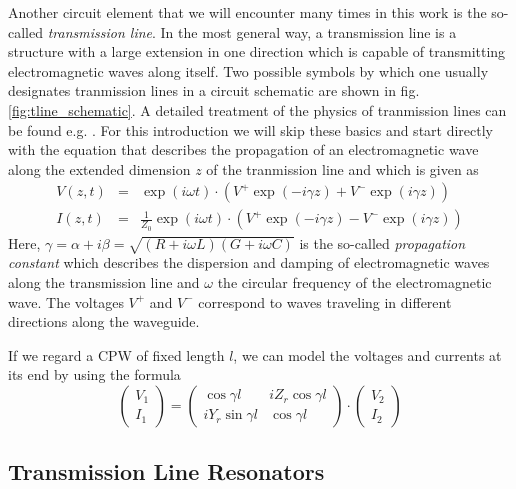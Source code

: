 Another circuit element that we will encounter many times in this work is the so-called {\it transmission line}. In the most general way, a transmission line is a structure with a large extension in one direction which is capable of transmitting electromagnetic waves along itself. Two possible symbols by which one usually designates tranmission lines in a circuit schematic are shown in fig. \ref{fig:tline_schematic}. A detailed treatment of the physics of tranmission lines can be found e.g. \cite{pozar_microwave_2011}. For this introduction we will skip these basics and start directly with the equation that describes the propagation of an electromagnetic wave along the extended dimension $z$ of the tranmission line and which is given as
%
\begin{eqnarray}
V(z,t) & = & \exp{\left(i\omega t\right)}\cdot\left(V^+ \exp{\left(-i\gamma z\right)}+V^-\exp{\left(i\gamma z\right)}\right) \\
I(z,t) & = & \frac{1}{Z_0}\exp{\left(i\omega t\right)}\cdot\left(V^+ \exp{\left(-i\gamma z\right)}-V^-\exp{\left(i\gamma z\right)}\right)
\end{eqnarray}
%
Here, $\gamma = \alpha+i\beta = \sqrt{(R+i\omega L)(G+i\omega C)}$ is the so-called {\it propagation constant} which describes the dispersion and damping of electromagnetic waves along the transmission line and $\omega$ the circular frequency of the electromagnetic wave. The voltages $V^+$ and $V^-$ correspond to waves traveling in different directions along the waveguide.

\smallskip

If we regard a CPW of fixed length $l$, we can model the voltages and currents at its end by using the formula\citep{pozar_microwave_2011}
%
\begin{equation}
\left( \begin{array}{c} V_1 \\ I_1 \end{array}\right) = \left( 
		\begin{array}{cc}
			\cos{\gamma l} & iZ_r \cos{\gamma l} \\
			i Y_r \sin{\gamma l} & \cos{\gamma l}
		\end{array}
		\right) \cdot \left(
		\begin{array}{c}
			V_2 \\ I_2
		\end{array}
		\right) \label{eq:cpw_abcd_matrix}
\end{equation}
%

\subsection{Transmission Line Resonators}

